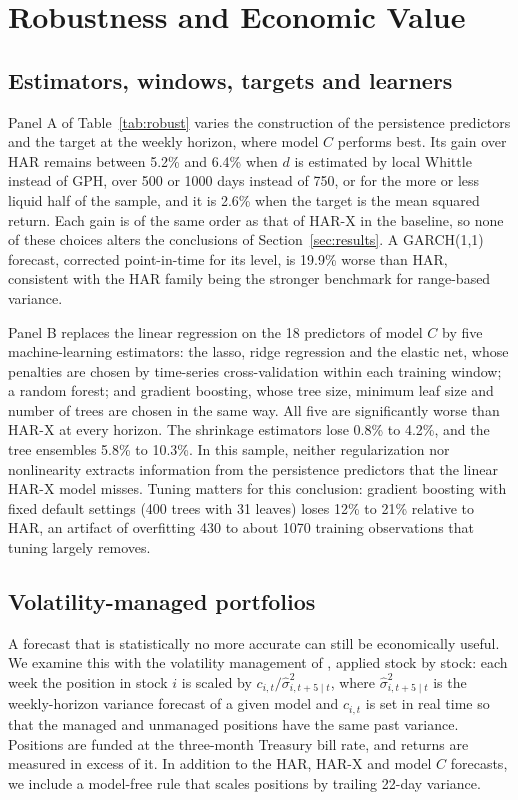 \section{Robustness and Economic Value}\label{sec:robust}

\subsection{Estimators, windows, targets and learners}

Panel A of Table~\ref{tab:robust} varies the construction of the persistence
predictors and the target at the weekly horizon, where model $C$ performs
best. Its gain over HAR remains between 5.2\% and 6.4\% when $d$ is estimated
by local Whittle instead of GPH, over 500 or 1000 days instead of 750, or for
the more or less liquid half of the sample, and it is 2.6\% when the target
is the mean squared return. Each gain is of the same order as that of HAR-X
in the baseline, so none of these choices alters the conclusions of
Section~\ref{sec:results}. A GARCH(1,1) forecast, corrected point-in-time for
its level, is 19.9\% worse than HAR, consistent with the HAR family being the
stronger benchmark for range-based variance.



Panel B replaces the linear regression on the 18 predictors of model $C$ by
five machine-learning estimators: the lasso, ridge regression and the elastic
net, whose penalties are chosen by time-series cross-validation within each
training window; a random forest; and gradient boosting, whose tree size,
minimum leaf size and number of trees are chosen in the same way. All five
are significantly worse than HAR-X at every horizon. The shrinkage
estimators lose 0.8\% to 4.2\%, and the tree ensembles 5.8\% to 10.3\%. In
this sample, neither regularization nor nonlinearity extracts information
from the persistence predictors that the linear HAR-X model misses. Tuning
matters for this conclusion: gradient boosting with fixed default settings
(400 trees with 31 leaves) loses 12\% to 21\% relative to HAR, an artifact of
overfitting 430 to about 1070 training observations that tuning largely
removes.

\subsection{Volatility-managed portfolios}

A forecast that is statistically no more accurate can still be economically
useful. We examine this with the volatility management of
\citet{moreira2017volatility}, applied stock by stock: each week the
position in stock $i$ is scaled by $c_{i,t}/\hat\sigma^2_{i,t+5\mid t}$,
where $\hat\sigma^2_{i,t+5\mid t}$ is the weekly-horizon variance forecast of
a given model and $c_{i,t}$ is set in real time so that the managed and
unmanaged positions have the same past variance. Positions are funded at the
three-month Treasury bill rate, and returns are measured in excess of it. In
addition to the HAR, HAR-X and model $C$ forecasts, we include a model-free
rule that scales positions by trailing 22-day variance.

